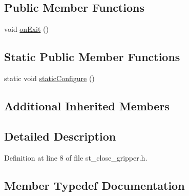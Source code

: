 \subsection*{Public Member Functions}
\begin{DoxyCompactItemize}
\item 
void \hyperlink{structsm__panda__moveit_1_1pick__states_1_1StCloseGripper_a04d82ae62c8b796fc0347d51db585e03}{on\+Exit} ()
\end{DoxyCompactItemize}
\subsection*{Static Public Member Functions}
\begin{DoxyCompactItemize}
\item 
static void \hyperlink{structsm__panda__moveit_1_1pick__states_1_1StCloseGripper_acdc40de3e9afc7f21e321787d56ab64e}{static\+Configure} ()
\end{DoxyCompactItemize}
\subsection*{Additional Inherited Members}


\subsection{Detailed Description}


Definition at line 8 of file st\+\_\+close\+\_\+gripper.\+h.



\subsection{Member Typedef Documentation}
\mbox{\label{structsm__panda__moveit_1_1pick__states_1_1StCloseGripper_af40cf0da3fc0139b082a1f892a616dc6}} 
